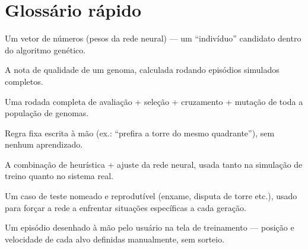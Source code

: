 \documentclass[11pt,a4paper]{article}
\begin{document}
\section{Glossário rápido}

\begin{description}[leftmargin=1.4em,style=nextline]
  \item[Genoma] Um vetor de números (pesos da rede neural) — um ``indivíduo'' candidato dentro do
    algoritmo genético.
  \item[Fitness] A nota de qualidade de um genoma, calculada rodando episódios simulados
    completos.
  \item[Geração] Uma rodada completa de avaliação + seleção + cruzamento + mutação de toda a
    população de genomas.
  \item[Heurística] Regra fixa escrita à mão (ex.: ``prefira a torre do mesmo quadrante''), sem
    nenhum aprendizado.
  \item[Controlador híbrido] A combinação de heurística + ajuste da rede neural, usada tanto na
    simulação de treino quanto no sistema real.
  \item[Cenário tático catalogado] Um caso de teste nomeado e reprodutível (enxame, disputa de
    torre etc.), usado para forçar a rede a enfrentar situações específicas a cada geração.
  \item[Cenário personalizado] Um episódio desenhado à mão pelo usuário na tela de treinamento —
    posição e velocidade de cada alvo definidas manualmente, sem sorteio.
\end{description}
\end{document}
